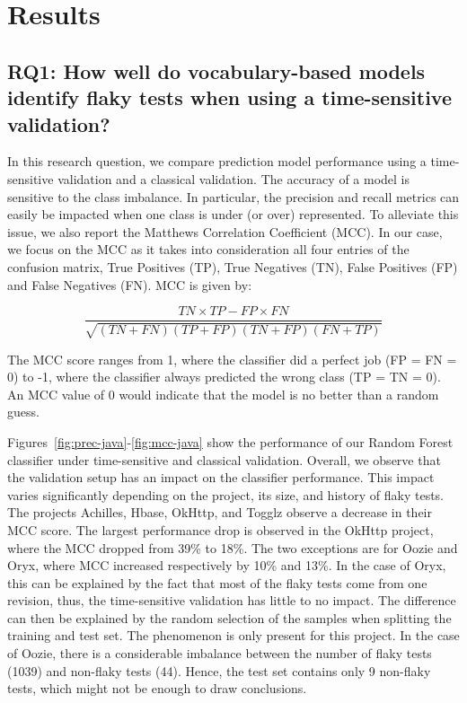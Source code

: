 \section{Results}
\label{sec:replication-results}


\subsection{RQ1: How well do vocabulary-based models identify flaky tests when using a  time-sensitive validation?}

In this research question, we compare prediction model performance using a time-sensitive validation and a classical validation.
The accuracy of a model is sensitive to the class imbalance. 
In particular, the precision and recall metrics can easily be impacted when one class is under (or over) represented. 
To alleviate this issue, we also report the Matthews Correlation Coefficient (MCC). 
In our case, we focus on the MCC as it takes into consideration all four entries of the confusion matrix, True Positives (TP), True Negatives (TN), False Positives (FP) and False Negatives (FN).
MCC is given by:

\[
    \frac{TN \times TP - FP \times FN}{\sqrt{(TN+FN)(TP+FP)(TN+FP)(FN+TP)}}
\]

\normalsize
The MCC score ranges from 1, where the classifier did a perfect job (FP = FN = 0) to -1, where the classifier always predicted the wrong class (TP = TN = 0). 
An MCC value of 0 would indicate that the model is no better than a random guess. 

Figures~\ref{fig:prec-java}-\ref{fig:mcc-java} show the performance of our Random Forest classifier under time-sensitive and classical validation. 
Overall, we observe that the validation setup has an impact on the classifier performance.
This impact varies significantly depending on the project, its size, and history of flaky tests.
The projects Achilles, Hbase, OkHttp, and Togglz observe a decrease in their MCC score.
The largest performance drop is observed in the OkHttp project, where the MCC dropped from 39\% to 18\%.
The two exceptions are for Oozie and Oryx, where MCC increased respectively by 10\% and 13\%. 
In the case of Oryx, this can be explained by the fact that most of the flaky tests come from one revision, thus, the time-sensitive validation has little to no impact. 
The difference can then be explained by the random selection of the samples when splitting the training and test set. 
The phenomenon is only present for this project.
In the case of Oozie, there is a considerable imbalance between the number of flaky tests (1039) and non-flaky tests (44). 
Hence, the test set contains only 9 non-flaky tests, which might not be enough to draw conclusions.\\

